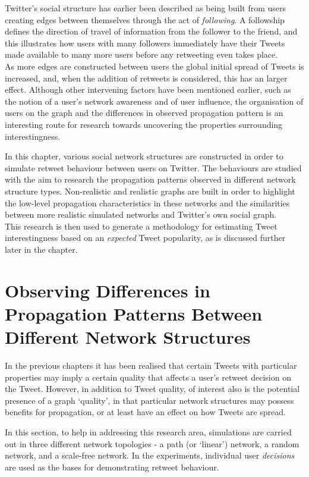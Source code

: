 Twitter's social structure has earlier been described as being built from users creating edges between themselves through the act of \textit{following}. A followship defines the direction of travel of information from the follower to the friend, and this illustrates how users with many followers immediately have their Tweets made available to many more users before any retweeting even takes place.\\
As more edges are constructed between users the global initial spread of Tweets is increased, and, when the addition of retweets is considered, this has an larger effect. Although other intervening factors have been mentioned earlier, such as the notion of a user's network awareness and of user influence, the organisation of users on the graph and the differences in observed propagation pattern is an interesting route for research towards uncovering the properties surrounding interestingness.

In this chapter, various social network structures are constructed in order to simulate retweet behaviour between users on Twitter. The behaviours are studied with the aim to research the propagation patterns observed in different network structure types. Non-realistic and realistic graphs are built in order to highlight the low-level propagation characteristics in these networks and the similarities between more realistic simulated networks and Twitter's own social graph.\\
This research is then used to generate a methodology for estimating Tweet interestingness based on an \textit{expected} Tweet popularity, as is discussed further later in the chapter.


\section{Observing Differences in Propagation Patterns Between Different Network Structures}
In the previous chapters it has been realised that certain Tweets with particular properties may imply a certain quality that affects a user's retweet decision on the Tweet. However, in addition to Tweet quality, of interest also is the potential presence of a graph `quality', in that particular network structures may possess benefits for propagation, or at least have an effect on how Tweets are spread.

In this section, to help in addressing this research area, simulations are carried out in three different network topologies - a path (or `linear') network, a random network, and a scale-free network. In the experiments, individual user \textit{decisions} are used as the bases for demonstrating retweet behaviour.  

